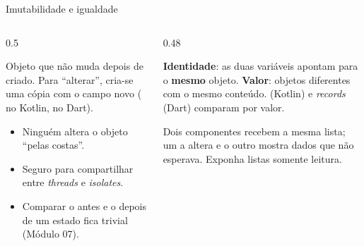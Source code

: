 \begin{frame}{Imutabilidade e igualdade}
  \begin{columns}[T]
    \begin{column}{0.5\textwidth}
      \begin{definicao}[Imutável]
        Objeto que não muda depois de criado. Para ``alterar'', cria-se uma cópia com o campo novo ( no Kotlin,  no Dart).
      \end{definicao}
      \begin{conceito}[Vantagens]
        \begin{itemize}
          \item Ninguém altera o objeto ``pelas costas''.
          \item Seguro para compartilhar entre \emph{threads} e \emph{isolates}.
          \item Comparar o antes e o depois de um estado fica trivial (Módulo 07).
        \end{itemize}
      \end{conceito}
    \end{column}
    \begin{column}{0.48\textwidth}
      \begin{definicao}
        \textbf{Identidade}: as duas variáveis apontam para o \textbf{mesmo} objeto. \textbf{Valor}: objetos diferentes com o mesmo conteúdo.  (Kotlin) e \emph{records} (Dart) comparam por valor.
      \end{definicao}
      \begin{erro}
        Dois componentes recebem a mesma lista; um a altera e o outro mostra dados que não esperava. Exponha listas somente leitura.
      \end{erro}
    \end{column}
  \end{columns}
\end{frame}
